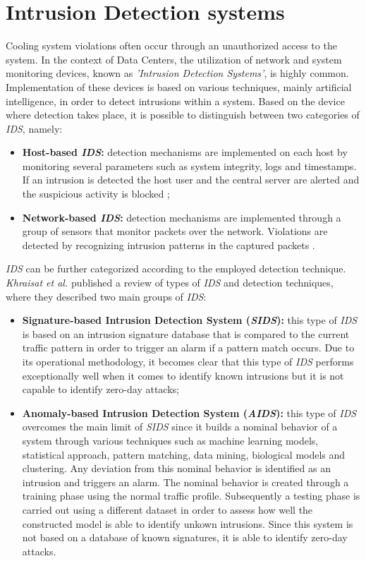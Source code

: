 \section{Intrusion Detection systems} \label{section:ids}
Cooling system violations often occur through an unauthorized access to the system. In the context of Data Centers, the utilization of network and system monitoring devices, known as \emph{'Intrusion Detection Systems'}, is highly common. Implementation of these devices is based on various techniques, mainly artificial intelligence, in order to detect intrusions within a system. Based on the device where detection takes place, it is possible to distinguish between two categories of \emph{IDS}, namely:
\begin{itemize}
    \item \textbf{Host-based \emph{IDS}:} detection mechanisms are implemented on each host by monitoring several parameters such as system integrity, logs and timestamps. If an intrusion is detected the host user and the central server are alerted and the suspicious activity is blocked \cite{sulaiman2021intrusion};
    \item \textbf{Network-based \emph{IDS}:} detection mechanisms are implemented through a group of sensors that monitor packets over the network. Violations are detected by recognizing intrusion patterns in the captured packets \cite{sulaiman2021intrusion}.
\end{itemize}
\emph{IDS} can be further categorized according to the employed detection technique. \emph{Khraisat et al.} \cite{khraisat2019survey} published a review of types of \emph{IDS} and detection techniques, where they described two main groups of \emph{IDS}:
\begin{itemize}
    \item \textbf{Signature-based Intrusion Detection System (\emph{SIDS}):} this type of \emph{IDS} is based on an intrusion signature database that is compared to the current traffic pattern in order to trigger an alarm if a pattern match occurs. Due to its operational methodology, it becomes clear that this type of \emph{IDS} performs exceptionally well when it comes to identify known intrusions but it is not capable to identify zero-day attacks;
    \item \textbf{Anomaly-based Intrusion Detection System (\emph{AIDS}):} this type of \emph{IDS} overcomes the main limit of \emph{SIDS} since it builds a nominal behavior of a system through various techniques such as machine learning models, statistical approach, pattern matching, data mining, biological models and clustering. Any deviation from this nominal behavior is identified as an intrusion and triggers an alarm. The nominal behavior is created through a training phase using the normal traffic profile. Subsequently a testing phase is carried out using a different dataset in order to assess how well the constructed model is able to identify unkown intrusions. Since this system is not based on a database of known signatures, it is able to identify zero-day attacks.  
\end{itemize}
